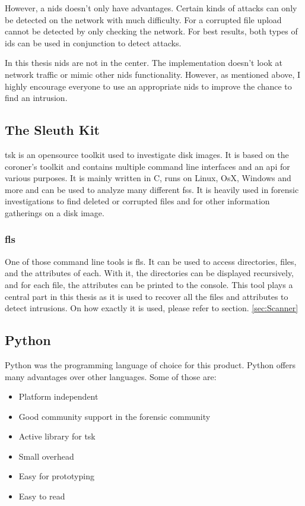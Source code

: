 However, a \gls{nids} doesn't only have advantages. Certain kinds of attacks can only be detected on the network with much difficulty. For a corrupted file upload cannot be detected by only checking the network. For best results, both types of \gls{ids} can be used in conjunction to detect attacks. 

In this thesis \gls{nids} are not in the center. The implementation doesn't look at network traffic or mimic other \gls{nids} functionality. However, as mentioned above, I highly encourage everyone to use an appropriate \gls{nids} to improve the chance to find an intrusion. 

\subsection{The Sleuth Kit}
\label{sec:tsk}

\gls{tsk} is an \gls{opensource} toolkit used to investigate disk images. It is based on the coroner's toolkit \cite{tct} and contains multiple command line interfaces and an \gls{api} for various purposes. \cite{tsk, tsk:about} It is mainly written in C, runs on Linux, OsX, Windows and more and can be used to analyze many different \glspl{fs}. It is heavily used in forensic investigations to find deleted or corrupted files and for other information gatherings on a disk image.

\subsubsection{fls}
\label{sec:fls}

One of those command line tools is fls. It can be used to access directories, files, and the attributes of each. With it, the directories can be displayed recursively, and for each file, the attributes can be printed to the console. \cite{tsk:fls} This tool plays a central part in this thesis as it is used to recover all the files and attributes to detect intrusions. On how exactly it is used, please refer to section. \ref{sec:Scanner}

\subsection{Python}
\label{sec:python}

Python was the programming language of choice for this product. Python offers many advantages over other languages. Some of those are:

\begin{itemize}
    \item Platform independent
    \item Good community support in the forensic community
    \item Active library for \gls{tsk}
    \item Small overhead
    \item Easy for prototyping
    \item Easy to read
\end{itemize}

